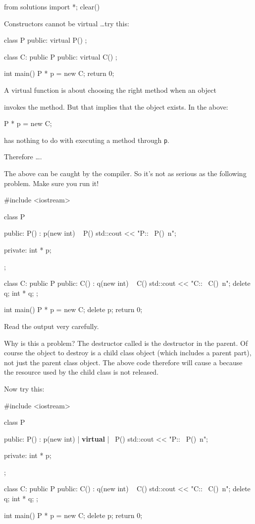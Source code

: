 \begin{python0}
from solutions import *; clear()
\end{python0}

Constructors cannot be virtual \ldots try this:

\begin{console}
class P
{
public:
     virtual P() {}
};

class C: public P
{
public:
     virtual C() {}
};

int main()
{   
    P * p = new C;
    return 0;
}
\end{console}

A virtual function is about choosing the right method when an object

invokes the method. But that implies that the object exists. In the above:
\begin{console}
    P * p = new C;
\end{console}

has nothing to do with executing a method through \verb!p!.

Therefore \ldots {}.

The above can be caught by the compiler. So it's not as serious as the following problem. Make sure you run it!

\begin{console}
#include <iostream>

class P
{
public:
     P() : p(new int) {}
     ~ P() { std::cout << "P::~ P()\ n"; }
     
private:
     int * p;
};

class C: public P
{
public:
     C() : q(new int) {}
     ~ C() { std::cout << "C::~ C()\ n"; delete q; }
     int * q;
};

int main()
{   
    P * p = new C;
    delete p;
    return 0;
}
\end{console}

Read the output very carefully.

Why is this a problem? The destructor called is the destructor in the parent. Of course the object to destroy is a child class object (which includes a parent part), not just the parent class object. The above code therefore will cause a  because the resource used by the child class is not released.

Now try this:

\begin{consolethree}[escapeinside=||]
#include <iostream>

class P
{
public:
     P() : p(new int) {}
     |\textbf{ virtual }|~ P() { std::cout << "P::~ P()\ n"; }

private:
     int * p;
};

class C: public P
{
public:
     C() : q(new int) {}
     ~ C() { std::cout << "C::~ C()\ n"; delete q; }
     int * q;
};

int main()
{   
    P * p = new C;
    delete p;
    return 0;
}
\end{consolethree}

